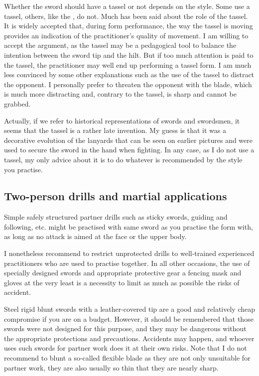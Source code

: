 Whether the sword should have a tassel or not depends on the style. Some use a tassel, others, like the \Yangjia{} \Michuan{}, do not.
Much has been said about the role of the tassel. It is widely accepted that, during form performance, the way the tassel is moving provides an indication of the practitioner's quality of movement. 
I am willing to accept the argument, as the tassel may be a pedagogical tool to balance the intention between the sword tip and the hilt. But if too much attention is paid to the tassel, the practitioner may well end up performing a tassel form. 
I am much less convinced by some other explanations such as the use of the tassel to distract the opponent. I personally prefer to threaten the opponent with the blade, which is much more distracting and, contrary to the tassel, is sharp and cannot be grabbed.

Actually, if we refer to historical representations of swords and swordsmen, it seems that the tassel is a rather late invention. My guess is that it was a decorative evolution of the lanyards that can be seen on earlier pictures and were used to secure the sword in the hand when fighting.
In any case, as I do not use a tassel, my only advice about it is to do whatever is recommended by the style you practise.

\subsection{Two-person drills and martial applications}
Simple safely structured partner drills such as sticky swords, guiding and following, etc. might be practised with same sword as you practise the form with, as long as no attack is aimed at the face or the upper body.

I nonetheless recommend to restrict unprotected drills to well-trained experienced practitioners who are used to practise together. In all other occasions, the use of specially designed swords and appropriate protective gear \textendash{} a fencing mask and gloves at the very least \textendash{} is a necessity to limit as much as possible the risks of accident. 

Steel rigid blunt swords with a leather-covered tip are a good and relatively cheap compromise if you are on a budget. However, it should be remembered that those swords were not designed for this purpose, and they may be dangerous without the appropriate protections and precautions. Accidents may happen, and whoever uses such swords for partner work does it at their own risks. Note that I do not recommend to blunt a so-called flexible blade as they are not only unsuitable for partner work, they are also usually so thin that they are nearly sharp. 

